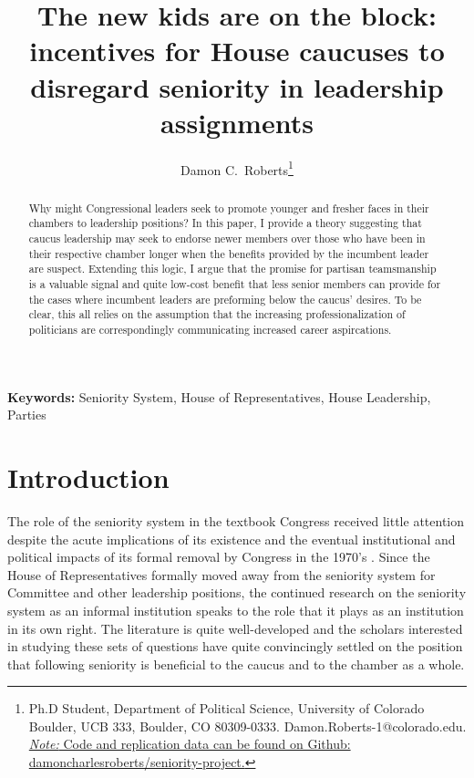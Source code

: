 \documentclass [12pt]{article}
\title{The new kids are on the block: incentives for House caucuses to disregard seniority in leadership assignments}
\author{Damon C.\ Roberts\footnote{Ph.D Student,
Department of Political Science, University of Colorado Boulder, UCB 333, Boulder, CO 80309-0333. Damon.Roberts-1@colorado.edu. 
\newline \href{https://github.com/DamonCharlesRoberts/seniority-project}{\textit{Note: }Code and replication data can be found on Github: damoncharlesroberts/seniority-project.}}}}
\date{}
\begin{document}
\maketitle
\begin{abstract}

Why might Congressional leaders seek to promote younger and fresher faces in their chambers to leadership positions? In this paper, I provide a theory suggesting that caucus leadership may seek to endorse newer members over those who have been in their respective chamber longer when the benefits provided by the incumbent leader are suspect. Extending this logic, I argue that the promise for partisan teamsmanship is a valuable signal and quite low-cost benefit that less senior members can provide for the cases where incumbent leaders are preforming below the caucus' desires. To be clear, this all relies on the assumption that the increasing professionalization of politicians are correspondingly communicating increased career aspircations.

\end{abstract}

\textbf{Keywords: } Seniority System, House of Representatives, House Leadership, Parties

\newpage
\doublespace
\newpage 
\section*{Introduction}

The role of the seniority system in the textbook Congress received little attention despite the acute implications of its existence and the eventual institutional and political impacts of its formal removal by Congress in the 1970's \cite{Celler1961}. Since the House of Representatives formally moved away from the seniority system for Committee and other leadership positions, the continued research on the seniority system as an informal institution speaks to the role that it plays as an institution in its own right. The literature is quite well-developed and the scholars interested in studying these sets of questions have quite convincingly settled on the position that following seniority is beneficial to the caucus and to the chamber as a whole.
\end{document}
